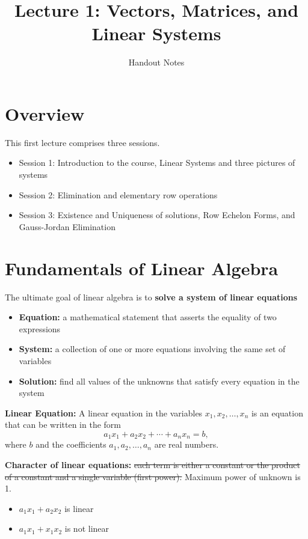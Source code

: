 \documentclass[11pt]{article}
\title{Lecture 1: Vectors, Matrices, and Linear Systems}
\author{Handout Notes}
\date{}
\theoremstyle{definition}
\begin{document}
\maketitle

\section*{Overview}
This first lecture comprises three sessions.

\begin{itemize}
    \item Session 1: Introduction to the course, Linear Systems and three pictures of systems 
    \item Session 2: Elimination and elementary row operations
    \item Session 3: Existence and Uniqueness of solutions, Row Echelon Forms, and Gauss-Jordan Elimination
\end{itemize}

\section{Fundamentals of Linear Algebra}

The ultimate goal of linear algebra is to \textbf{solve a system of linear equations}

\begin{itemize}
    \item \textbf{Equation:} a mathematical statement that asserts the equality of two expressions
    \item \textbf{System:} a collection of one or more equations involving the same set of variables
    \item \textbf{Solution:} find all values of the unknowns that satisfy every equation in the system
\end{itemize}

\textbf{Linear Equation:} A linear equation in the variables $x_1, x_2, \ldots, x_n$ is an equation that can be written in the form
\[
    a_1x_1 + a_2x_2 + \cdots + a_nx_n = b,
\]
where $b$ and the coefficients $a_1, a_2, \ldots, a_n$ are real numbers.

\textbf{Character of linear equations:} \sout{each term is either a constant or the product of a constant and a single variable (first power).} Maximum power of unknown is 1.
\begin{itemize}
    \item $a_1x_1 + a_2x_2$ is linear
    \item $a_1x_1 + x_1x_2$ is not linear
\end{itemize}
\end{document}
